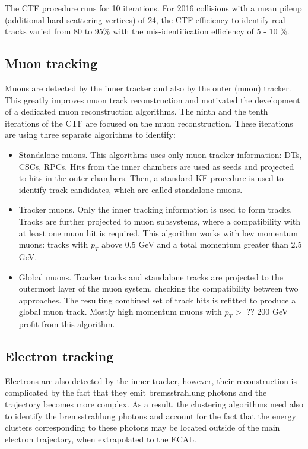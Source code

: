 \begin{small}
The CTF procedure runs for 10 iterations. For 2016 collisions with a mean pileup (additional hard scattering vertices) of 24, the CTF efficiency to identify real tracks varied from 80 to 95$\%$ with the mis-identification efficiency of 5 - 10 $\%$.



\subsection{Muon tracking}\label{sec:muon_track_reconstruction}

Muons are detected by the inner tracker and also by the outer (muon) tracker. This greatly improves muon track reconstruction and motivated the development of a dedicated muon reconstruction algorithms. The ninth and the tenth iterations of the CTF are focused on the muon reconstruction. These iterations are using three separate algorithms to identify: 

\begin{itemize}

\item Standalone muons. This algorithms uses only muon tracker information: DTs, CSCs, RPCs. Hits from the inner chambers are used as seeds and projected to hits in the outer chambers. Then, a standard KF procedure is used to identify track candidates, which are called standalone muons.
\item Tracker muons. Only the inner tracking information is used to form tracks. Tracks are further projected to muon subsystems, where a compatibility with at least one muon hit is required. This algorithm works with low momentum muons: tracks with $p_T$ above 0.5 GeV and a total momentum greater than 2.5 GeV.
\item Global muons. Tracker tracks and standalone tracks are projected to the outermost layer of the muon system, checking the compatibility between two approaches. The resulting combined set of track hits is refitted to produce a global muon track. Mostly high momentum muons with $p_T > $ ?? 200 GeV profit from this algorithm.
\end{itemize}


\subsection{Electron tracking}\label{sec:ele_track_reconstruction}
Electrons are also detected by the inner tracker, however, their reconstruction is complicated by the fact that they emit bremsstrahlung photons and the trajectory becomes more complex. As a result, the clustering algorithms need also to identify the bremsstrahlung photons and account for the fact that the energy clusters corresponding to these photons may be located outside of the main electron trajectory, when extrapolated to the ECAL. 


\end{small}
